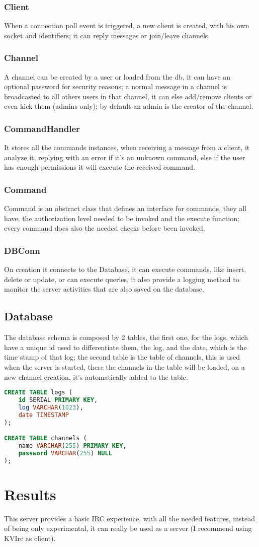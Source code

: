 \documentclass{article}
\begin{document}
\subsubsection{Client}
When a connection poll event is triggered, a new client is created, with his own socket and identifiers; it can reply messages or join/leave channels.

\subsubsection{Channel}
A channel can be created by a user or loaded from the db, it can have an optional password for security reasons; a normal message in a channel is broadcasted to all others users in that channel, it can else add/remove clients or even kick them (admins only); by default an admin is the creator of the channel.

\subsubsection{CommandHandler}
It stores all the commands instances, when receiving a message from a client, it analyze it, replying with an error if it's an unknown command, else if the user has enough permissions it will execute the received command. 

\subsubsection{Command}
Command is an abstract class that defines an interface for commands, they all have, the authorization level needed to be invoked and the execute function; every command does also the needed checks before been invoked.

\subsubsection{DBConn}
On creation it connects to the Database, it can execute commands, like insert, delete or update, or can execute queries, it also provide a logging method to monitor the server activities that are also saved on the database.


\subsection{Database}
The database schema is composed by 2 tables, the first one, for the logs, which have a unique id used to differentiate them, the log, and the date, which is the time stamp of that log; the second table is the table of channels, this is used when the server is started, there the channels in the table will be loaded, on a new channel creation, it's automatically added to the table.
\begin{lstlisting}[language=SQL, caption={DB Schema}, label={DB Schema}]
CREATE TABLE logs (
	id SERIAL PRIMARY KEY,
	log VARCHAR(1023),
	date TIMESTAMP
);

CREATE TABLE channels (
	name VARCHAR(255) PRIMARY KEY,
	password VARCHAR(255) NULL
);
\end{lstlisting}


\section{Results}
This server provides a basic IRC experience, with all the needed features, instead of being only experimental, it can really be used as a server (I recommend using KVIrc as client).
\end{document}
